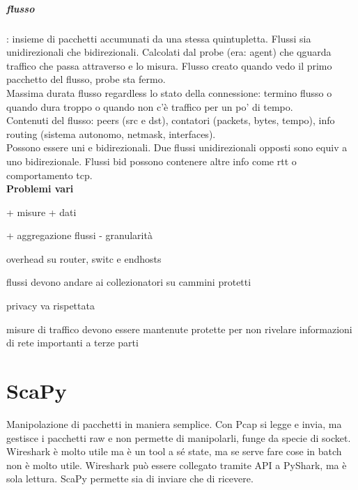 \documentclass[10pt]{book}
\begin{document}
\paragraph{flusso}: insieme di pacchetti accumunati da una stessa quintupletta. Flussi sia unidirezionali che bidirezionali. Calcolati dal probe (era: agent) che qguarda traffico che passa attraverso e lo misura. Flusso creato quando vedo il primo pacchetto del flusso, probe sta fermo.\\
Massima durata flusso regardless lo stato della connessione: termino flusso o quando dura troppo o quando non c'è traffico per un po' di tempo.\\
Contenuti del flusso: peers (src e dst), contatori (packets, bytes, tempo), info routing (sistema autonomo, netmask, interfaces).\\
Possono essere uni e bidirezionali. Due flussi unidirezionali opposti sono equiv a uno bidirezionale. Flussi bid possono contenere altre info come rtt o comportamento tcp.\\
\textbf{Problemi vari}\\
\begin{list}{}{Overhead vs accuratezza}
	\item + misure + dati
	\item + aggregazione flussi - granularità
	\item overhead su router, switc e endhosts
\end{list}
\begin{list}{}{Security vs data sharing}
	\item flussi devono andare ai collezionatori su cammini protetti
	\item privacy va rispettata
	\item misure di traffico devono essere mantenute protette per non rivelare informazioni di rete importanti a terze parti
\end{list}
\chapter{ScaPy}
Manipolazione di pacchetti in maniera semplice. Con Pcap si legge e invia, ma gestisce i pacchetti raw e non permette di manipolarli, funge da specie di socket. Wireshark è molto utile ma è un tool a sé state, ma se serve fare cose in batch non è molto utile. Wireshark può essere collegato tramite API a PyShark, ma è sola lettura. ScaPy permette sia di inviare che di ricevere.
\end{document}
